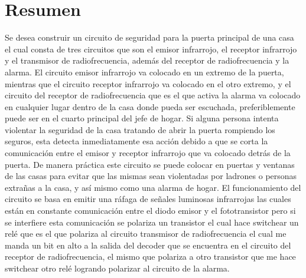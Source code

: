 \documentclass[a4paper,11pt]{article}
\begin{document}
\section{Resumen}
Se desea construir un circuito de seguridad para la puerta principal de una casa el cual consta de tres circuitos que son el emisor infrarrojo, el receptor infrarrojo y el transmisor de radiofrecuencia, además del receptor de radiofrecuencia y la alarma. El circuito emisor infrarrojo va colocado en un extremo de la puerta, mientras que el circuito receptor infrarrojo va colocado en el otro extremo, y el circuito del receptor de radiofrecuencia que es el que activa la alarma va colocado en cualquier lugar dentro de la casa donde pueda ser escuchada, preferiblemente puede ser en el cuarto principal del jefe de hogar. Si alguna persona intenta violentar la seguridad de la casa tratando de abrir la puerta rompiendo los seguros, esta detecta inmediatamente esa acción debido a que se corta la comunicación entre el emisor y receptor infrarrojo que va colocado detrás de la puerta. De manera práctica este circuito se puede colocar en puertas y ventanas de las casas para evitar que las mismas sean violentadas por ladrones o personas extrañas a la casa, y así mismo como  una alarma de hogar. 
El funcionamiento del circuito se basa en emitir una ráfaga de señales luminosas infrarrojas las cuales 	están en constante comunicación entre el diodo emisor y el fototransistor pero si se interfiere esta comunicación se polariza un transistor el cual hace switchear un relé que es el que polariza al circuito transmisor de radiofrecuencia el cual me manda un bit en alto a la salida del decoder que se encuentra en el circuito del receptor de radiofrecuencia, el mismo que polariza a otro transistor que me hace switchear otro relé logrando polarizar al circuito de la alarma. 
\end{document}
